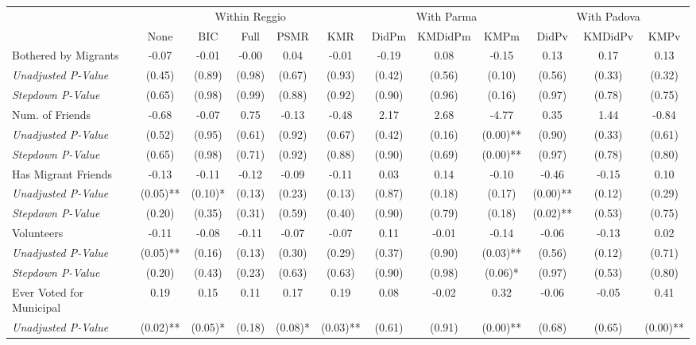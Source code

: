 \begin{tabular}{l c c c c c c c c c c c}
\toprule
& \multicolumn{5}{c}{Within Reggio} & \multicolumn{3}{c}{With Parma} & \multicolumn{3}{c}{With Padova} \\\cmidrule(lr){2-6} \cmidrule(lr){7-9} \cmidrule(lr){10-12}
 & None & BIC & Full & PSMR & KMR & DidPm & KMDidPm & KMPm & DidPv & KMDidPv & KMPv \\
\midrule
Bothered by Migrants & -0.07 & -0.01 & -0.00 & 0.04 & -0.01 & -0.19 & 0.08 & -0.15 & 0.13 & 0.17 & 0.13 \\
\quad \textit{Unadjusted P-Value} & (0.45) & (0.89) & (0.98) & (0.67) & (0.93) & (0.42) & (0.56) & (0.10) & (0.56) & (0.33) & (0.32) \\
\quad \textit{Stepdown P-Value} & (0.65) & (0.98) & (0.99) & (0.88) & (0.92) & (0.90) & (0.96) & (0.16) & (0.97) & (0.78) & (0.75) \\
Num. of Friends & -0.68 & -0.07 & 0.75 & -0.13 & -0.48 & 2.17 & 2.68 & -4.77 & 0.35 & 1.44 & -0.84 \\
\quad \textit{Unadjusted P-Value} & (0.52) & (0.95) & (0.61) & (0.92) & (0.67) & (0.42) & (0.16) & (0.00)** & (0.90) & (0.33) & (0.61) \\
\quad \textit{Stepdown P-Value} & (0.65) & (0.98) & (0.71) & (0.92) & (0.88) & (0.90) & (0.69) & (0.00)** & (0.97) & (0.78) & (0.80) \\
Has Migrant Friends & -0.13 & -0.11 & -0.12 & -0.09 & -0.11 & 0.03 & 0.14 & -0.10 & -0.46 & -0.15 & 0.10 \\
\quad \textit{Unadjusted P-Value} & (0.05)** & (0.10)* & (0.13) & (0.23) & (0.13) & (0.87) & (0.18) & (0.17) & (0.00)** & (0.12) & (0.29) \\
\quad \textit{Stepdown P-Value} & (0.20) & (0.35) & (0.31) & (0.59) & (0.40) & (0.90) & (0.79) & (0.18) & (0.02)** & (0.53) & (0.75) \\
Volunteers & -0.11 & -0.08 & -0.11 & -0.07 & -0.07 & 0.11 & -0.01 & -0.14 & -0.06 & -0.13 & 0.02 \\
\quad \textit{Unadjusted P-Value} & (0.05)** & (0.16) & (0.13) & (0.30) & (0.29) & (0.37) & (0.90) & (0.03)** & (0.56) & (0.12) & (0.71) \\
\quad \textit{Stepdown P-Value} & (0.20) & (0.43) & (0.23) & (0.63) & (0.63) & (0.90) & (0.98) & (0.06)* & (0.97) & (0.53) & (0.80) \\
Ever Voted for Municipal & 0.19 & 0.15 & 0.11 & 0.17 & 0.19 & 0.08 & -0.02 & 0.32 & -0.06 & -0.05 & 0.41 \\
\quad \textit{Unadjusted P-Value} & (0.02)** & (0.05)* & (0.18) & (0.08)* & (0.03)** & (0.61) & (0.91) & (0.00)** & (0.68) & (0.65) & (0.00)** \\

\end{tabular}
